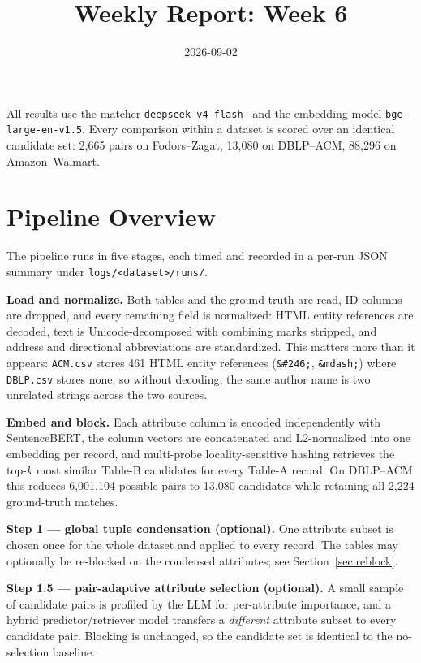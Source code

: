 \documentclass[11pt]{article}
\title{Weekly Report: Week 6}
\author{}
\date{2026-09-02}
\begin{document}
\maketitle

All results use the matcher
\texttt{deepseek-\allowbreak v4-\allowbreak flash-} and the embedding
model \texttt{bge-\allowbreak large-\allowbreak en-\allowbreak v1.5}. Every comparison within a dataset is scored over an identical
candidate set: 2{,}665 pairs on Fodors--Zagat, 13{,}080 on DBLP--ACM, 88{,}296 on
Amazon--Walmart.

\section{Pipeline Overview}

The pipeline runs in five stages, each timed and recorded in a per-run JSON summary under
\texttt{logs/<dataset>/runs/}.

\textbf{Load and normalize.} Both tables and the ground truth are read, ID columns are
dropped, and every remaining field is normalized: HTML entity references are decoded, text
is Unicode-decomposed with combining marks stripped, and address and directional
abbreviations are standardized. This matters more than it appears: \texttt{ACM.csv} stores
461 HTML entity references (\texttt{\&\#246;}, \texttt{\&mdash;}) where \texttt{DBLP.csv}
stores none, so without decoding, the same author name is two unrelated strings across the
two sources.

\textbf{Embed and block.} Each attribute column is encoded independently with SentenceBERT,
the column vectors are concatenated and L2-normalized into one embedding per record, and
multi-probe locality-sensitive hashing retrieves the top-$k$ most similar Table-B candidates
for every Table-A record. On DBLP--ACM this reduces 6{,}001{,}104 possible pairs to 13{,}080
candidates while retaining all 2{,}224 ground-truth matches.

\textbf{Step 1 --- global tuple condensation (optional).} One attribute subset is chosen
once for the whole dataset and applied to every record. The tables may optionally be
re-blocked on the condensed attributes; see Section~\ref{sec:reblock}.

\textbf{Step 1.5 --- pair-adaptive attribute selection (optional).} A small sample of
candidate pairs is profiled by the LLM for per-attribute importance, and a hybrid
predictor/retriever model transfers a \emph{different} attribute subset to every candidate
pair. Blocking is unchanged, so the candidate set is identical to the no-selection baseline.
\end{document}
